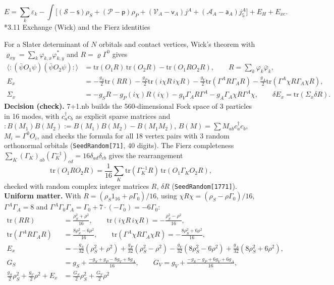 \documentclass[10pt,a4paper]{article}
\makeatletter
\renewcommand\subsection{\@startsection{subsection}{2}{\z@}{-3.25ex\@plus -1ex \@minus -.2ex}{1.5ex \@plus .2ex}{\normalfont\large\bfseries\raggedright}}
\makeatother
\begin{document}
\begin{equation*}
E=\sum_k\varepsilon_k-\int\big[(\mathcal S-\mathsf s)\rho_S+(\mathcal P-\mathsf p)\rho_P+(\mathcal V_A-\mathsf v_A)j^A+(\mathcal A_A-\mathsf a_A)j_5^A\big]+E_H+E_{xc}.
\end{equation*}
\subsection*{3.11 Exchange (Wick) and the Fierz identities}
For a Slater determinant of $N$ orbitals and contact vertices, Wick’s theorem with $\varrho_{xy}=\sum_k\varphi_{k,x}\varphi_{k,y}^*$ and $R=\varrho\Gamma^0$ gives
\begin{align*}
\langle:(\bar\psi O_1\psi)(\bar\psi O_2\psi):\rangle&=\mathrm{tr}(O_1R)\,\mathrm{tr}(O_2R)-\mathrm{tr}(O_1RO_2R),\qquad R=\sum_k\varphi_k\bar\varphi_k, \\
E_x&=-\frac{g_S}2\mathrm{tr}(RR)-\frac{g_P}2\mathrm{tr}(i\chi R\,i\chi R)-\frac{g_V}2\mathrm{tr}(\Gamma^AR\Gamma_AR)-\frac{g_A}2\mathrm{tr}(\Gamma^A\chi R\Gamma_A\chi R), \\
\Sigma_x&=-g_SR-g_P(i\chi)R(i\chi)-g_V\Gamma_AR\Gamma^A-g_A\Gamma_A\chi R\Gamma^A\chi,\qquad \delta E_x=\mathrm{tr}(\Sigma_x\delta R).
\end{align*}
\textbf{Decision (check).} 7+1.nb builds the 560-dimensional Fock space of 3 particles in 16 modes, with $c_a^\dagger c_b$ as explicit sparse matrices and $:B(M_1)B(M_2):=B(M_1)B(M_2)-B(M_1M_2)$, $B(M)=\sum M_{ab}c_a^\dagger c_b$, $M_i=\Gamma^0O_i$, and checks the formula for all 18 vertex pairs with 3 random orthonormal orbitals (\texttt{SeedRandom[71]}, 40 digits). The Fierz completeness $\sum_K(\Gamma_K)_{ab}(\Gamma_K^{-1})_{cd}=16\delta_{ad}\delta_{cb}$ gives the rearrangement
\begin{equation*}
\mathrm{tr}(O_1RO_2R)=\frac1{16}\sum_K\mathrm{tr}(\Gamma_K^{-1}R)\,\mathrm{tr}(O_1\Gamma_KO_2R),
\end{equation*}
checked with random complex integer matrices $R$, $\delta R$ (\texttt{SeedRandom[1771]}). \textbf{Uniform matter.} With $R=(\rho_S1_{16}+\rho\Gamma_0)/16$, using $\chi R\chi=(\rho_S-\rho\Gamma_0)/16$, $\Gamma^A\Gamma_A=8$ and $\Gamma^A\Gamma_0\Gamma_A=\Gamma_0+7\cdot(-\Gamma_0)=-6\Gamma_0$:
\begin{align*}
\mathrm{tr}(RR)&=\frac{\rho_S^2+\rho^2}{16},\qquad \mathrm{tr}(i\chi R\,i\chi R)=-\frac{\rho_S^2-\rho^2}{16}, \\
\mathrm{tr}(\Gamma^AR\Gamma_AR)&=\frac{8\rho_S^2-6\rho^2}{16},\qquad \mathrm{tr}(\Gamma^A\chi R\Gamma_A\chi R)=-\frac{8\rho_S^2+6\rho^2}{16}, \\
E_x&=-\frac{g_S}{32}(\rho_S^2+\rho^2)+\frac{g_P}{32}(\rho_S^2-\rho^2)-\frac{g_V}{32}(8\rho_S^2-6\rho^2)+\frac{g_A}{32}(8\rho_S^2+6\rho^2), \\
G_S&=g_S+\frac{-g_S+g_P-8g_V+8g_A}{16},\qquad G_V=g_V+\frac{-g_S-g_P+6g_V+6g_A}{16}, \\
\frac{g_S}2\rho_S^2+\frac{g_V}2\rho^2+E_x&=\frac{G_S}2\rho_S^2+\frac{G_V}2\rho^2
\end{align*}
\end{document}
